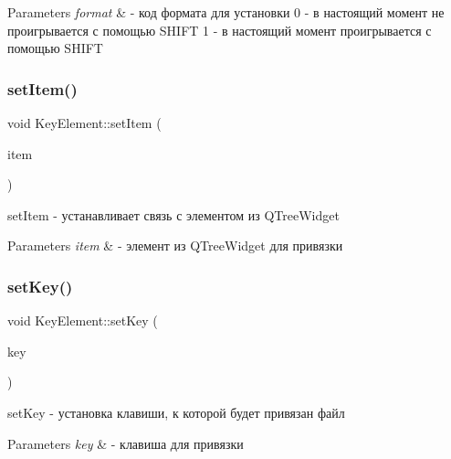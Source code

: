 \begin{DoxyParams}{Parameters}
{\em format} & -\/ код формата для установки 0 -\/ в настоящий момент не проигрывается с помощью S\+H\+I\+FT 1 -\/ в настоящий момент проигрывается с помощью S\+H\+I\+FT \\
\hline
\end{DoxyParams}
\mbox{\label{class_key_element_ab05c8efbfa5efad73e4e3b46d1521336}} 
\subsubsection{\texorpdfstring{set\+Item()}{setItem()}}
{\footnotesize\ttfamily void Key\+Element\+::set\+Item (\begin{DoxyParamCaption}\item[{Q\+Tree\+Widget\+Item $\ast$}]{item }\end{DoxyParamCaption})}



set\+Item -\/ устанавливает связь с элементом из Q\+Tree\+Widget 


\begin{DoxyParams}{Parameters}
{\em item} & -\/ элемент из Q\+Tree\+Widget для привязки \\
\hline
\end{DoxyParams}
\mbox{\label{class_key_element_a19d376b834c91498ac136cf39ee31b5d}} 
\subsubsection{\texorpdfstring{set\+Key()}{setKey()}}
{\footnotesize\ttfamily void Key\+Element\+::set\+Key (\begin{DoxyParamCaption}\item[{Q\+Char}]{key }\end{DoxyParamCaption})}



set\+Key -\/ установка клавиши, к которой будет привязан файл 


\begin{DoxyParams}{Parameters}
{\em key} & -\/ клавиша для привязки \\
\hline
\end{DoxyParams}
\mbox{\label{class_key_element_a3e9909b7a88b5bbba3b9fafe0d3a6652}} 
